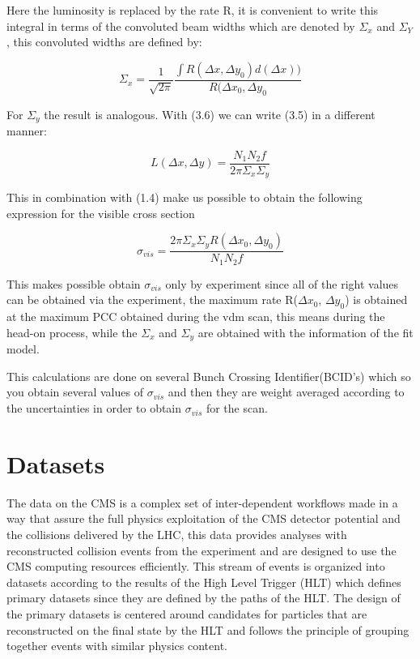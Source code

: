 Here the luminosity is replaced by the rate R, it is convenient to write this integral in terms of the convoluted beam widths which are denoted by $\Sigma_{x}$ and $\Sigma_{Y}$, this convoluted widths are defined by: 

\begin{equation}
\Sigma_{x} = \frac{1}{\sqrt{2 \pi}} \frac{\int R(\Delta x, \Delta y_{0}) d(\Delta x) )}{R(\Delta x_{0}, \Delta y_{0}}
\end{equation}

For $\Sigma_{y}$ the result is analogous. With (3.6) we can write (3.5) in a different manner:

\begin{equation}
L(\Delta x, \Delta y) = \frac{N_{1}N_{2}f}{2 \pi \Sigma_{x} \Sigma_{y}}
\end{equation}  

This in combination with (1.4) make us possible to obtain the following expression for the visible cross section

\begin{equation}
\sigma_{vis} = \frac{2 \pi \Sigma_{x} \Sigma_{y} R(\Delta x_{0}, \Delta y_{0})}{N_{1} N_{2}f}
\end{equation}

This makes possible obtain $\sigma_{vis}$ only by experiment since all of the right values can be obtained via the experiment, the maximum rate R($\Delta x_{0}$, $\Delta y_{0}$) is obtained at the maximum PCC obtained during the vdm scan, this means during the head-on process, while the $\Sigma_{x}$ and $\Sigma_{y}$ are obtained with the information of the fit model. 

This calculations are done on several Bunch Crossing Identifier(BCID's) which so you obtain several values of $\sigma_{vis}$ and then they are weight averaged according to the uncertainties in order to obtain $\sigma_{vis}$ for the scan. 

\section{Datasets}

The data on the CMS is a complex set of inter-dependent workflows made in a way that assure the full physics exploitation of the CMS detector potential and the collisions delivered by the LHC, this data provides analyses with reconstructed collision events from the experiment and are designed to use the CMS computing resources efficiently. This stream of events is organized into datasets according to the results of the High Level Trigger (HLT) which defines primary datasets since they are defined by the paths of the HLT. The design of the primary datasets is centered around candidates for particles that are reconstructed on the final state by the HLT and follows the principle of grouping together events with similar physics content.    \cite{datasets1}

